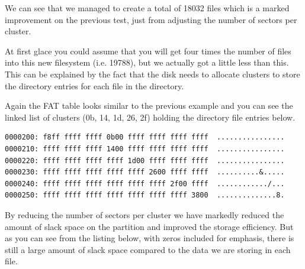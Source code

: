\documentclass[a4paper,
    11pt,
    normalheadings,
    parindent,
    UKenglish,
    abstracton,
    ]{scrartcl}
\begin{document}
We can see that we managed to create a total of 18032 files which is a marked improvement on the previous test, just from adjusting the number of sectors per cluster.

At first glace you could assume that you will get four times the number of files into this new filesystem (i.e. 19788), but we actually got a little less than this. This can be explained by the fact that the disk needs to allocate clusters to store the directory entries for each file in the directory.

Again the FAT table looks similar to the previous example and you can see the linked list of clusters (0b, 14, 1d, 26, 2f) holding the directory file entries below.
\begin{verbatim}
0000200: f8ff ffff ffff 0b00 ffff ffff ffff ffff  ................
0000210: ffff ffff ffff 1400 ffff ffff ffff ffff  ................
0000220: ffff ffff ffff ffff 1d00 ffff ffff ffff  ................
0000230: ffff ffff ffff ffff ffff 2600 ffff ffff  ..........&.....
0000240: ffff ffff ffff ffff ffff ffff 2f00 ffff  ............/...
0000250: ffff ffff ffff ffff ffff ffff ffff 3800  ..............8.
\end{verbatim}

By reducing the number of sectors per cluster we have markedly reduced the amount of slack space on the partition and improved the storage efficiency. But as you can see from the listing below, with zeros included for emphasis, there is still a large amount of slack space compared to the data we are storing in each file.
\end{document}

